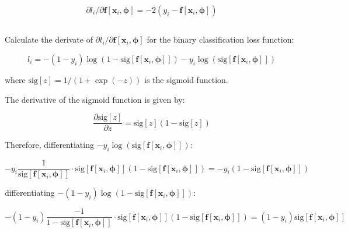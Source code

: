 \documentclass[12pt]{report}
\begin{document}
\begin{equation*}
    \partial l_{i} / \partial \mathbf{f}[\mathbf{x}_{i}, \boldsymbol{\phi}] = -2(y_{i} - \mathbf{f}[\mathbf{x}_{i}, \boldsymbol{\phi}])
\end{equation*}

\subsection{}
\begin{mdframed}
    Calculate the derivate of $\partial l_{i} / \partial \mathbf{f}[\mathbf{x}_{i}, \boldsymbol{\phi}]$ for the binary classification loss function:

    \begin{equation*}
        l_{i} = -(1-y_{i})\log(1-\text{sig}[\mathbf{f}[\mathbf{x}_{i}, \boldsymbol{\phi}]]) - y_{i}\log(\text{sig}[\mathbf{f}[\mathbf{x}_{i}, \boldsymbol{\phi}]])
    \end{equation*}

    where $\text{sig}[z] = 1/(1 + \exp(-z))$ is the sigmoid function.
\end{mdframed}

The derivative of the sigmoid function is given by:

\begin{equation*}
    \frac{\partial \text{sig}[z]}{\partial z} = \text{sig}[z](1 - \text{sig}[z])
\end{equation*}

Therefore, differentiating $-y_{i}\log(\text{sig}[\mathbf{f}[\mathbf{x}_{i}, \boldsymbol{\phi}]])$:

\begin{equation*}
    -y_{i}\frac{1}{\text{sig}[\mathbf{f}[\mathbf{x}_{i}, \boldsymbol{\phi}]]}\cdot \text{sig}[\mathbf{f}[\mathbf{x}_{i}, \boldsymbol{\phi}]](1 - \text{sig}[\mathbf{f}[\mathbf{x}_{i}, \boldsymbol{\phi}]]) = -y_{i}(1 - \text{sig}[\mathbf{f}[\mathbf{x}_{i}, \boldsymbol{\phi}]])
\end{equation*}

differentiating $-(1-y_{i})\log(1-\text{sig}[\mathbf{f}[\mathbf{x}_{i}, \boldsymbol{\phi}]])$:

\begin{equation*}
    -(1-y_{i})\frac{-1}{1 - \text{sig}[\mathbf{f}[\mathbf{x}_{i}, \boldsymbol{\phi}]]}\cdot \text{sig}[\mathbf{f}[\mathbf{x}_{i}, \boldsymbol{\phi}]](1 - \text{sig}[\mathbf{f}[\mathbf{x}_{i}, \boldsymbol{\phi}]]) = (1-y_{i})\text{sig}[\mathbf{f}[\mathbf{x}_{i}, \boldsymbol{\phi}]]
\end{equation*}
\end{document}
